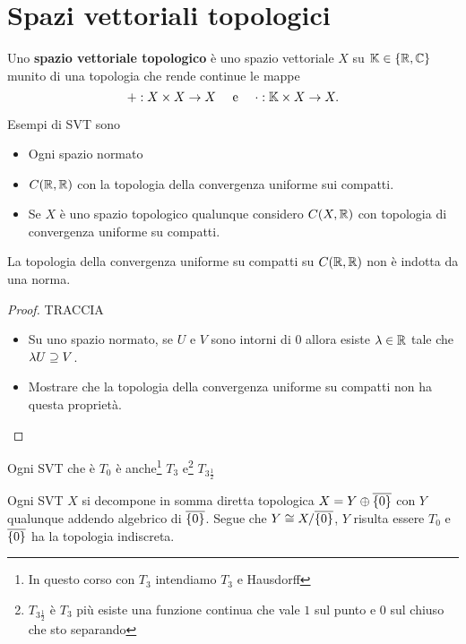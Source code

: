 \chapter{Spazi vettoriali topologici}

\begin{definition}
Uno \textbf{spazio vettoriale topologico} \`e uno spazio vettoriale $X$ su $\mathbb{K}\in\left\{{\mathbb{R},\mathbb{C}}\right\}$ munito di una topologia che rende continue le mappe 
\[+:X\times X\to X\quad \text{ e }\quad\cdot:\mathbb{K}\times X\to X.\]
\end{definition}
\begin{example}
Esempi di SVT sono
\begin{itemize}
    \item Ogni spazio normato
    \item $C(\mathbb{R},\mathbb{R})$ con la topologia della convergenza uniforme sui compatti.
    \item Se $X$ \`e uno spazio topologico qualunque considero $C(X,\mathbb{R})$ con topologia di convergenza uniforme su compatti.
\end{itemize}
\end{example}

\begin{exercise}
La topologia della convergenza uniforme su compatti su $C(\mathbb{R},\mathbb{R})$ non \`e indotta da una norma.
\end{exercise}
\begin{proof}
TRACCIA
\begin{itemize}
    \item Su uno spazio normato, se $U$ e $V$ sono intorni di 0 allora esiste $\lambda\in\mathbb{R}$ tale che $\lambda U\supseteq V$.
    \item Mostrare che la topologia della convergenza uniforme su compatti non ha questa propriet\`a.
\end{itemize}
\end{proof}

\begin{exercise}
Ogni SVT che \`e $T_0$ \`e anche\footnote{In questo corso con $T_3$ intendiamo $T_3$ e Hausdorff} $T_3$ e\footnote{$T_{3\frac12}$ \`e $T_3$ pi\`u esiste una funzione continua che vale $1$ sul punto e $0$ sul chiuso che sto separando} $T_{3\frac12}$
\end{exercise}
\begin{exercise}
Ogni SVT $X$ si decompone in somma diretta topologica $X=Y\oplus \overline{\left\{{0}\right\}}$ con $Y$ qualunque addendo algebrico di $\overline{\left\{{0}\right\}}$. Segue che $Y\cong X/\overline{\left\{{0}\right\}}$, $Y$ risulta essere $T_0$ e $\overline{\left\{{0}\right\}}$ ha la topologia indiscreta.
\end{exercise}

